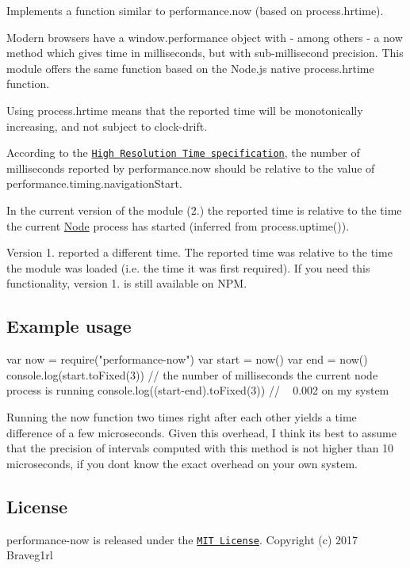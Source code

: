 Implements a function similar to {\ttfamily performance.\+now} (based on {\ttfamily process.\+hrtime}).

Modern browsers have a {\ttfamily window.\+performance} object with -\/ among others -\/ a {\ttfamily now} method which gives time in milliseconds, but with sub-\/millisecond precision. This module offers the same function based on the Node.\+js native {\ttfamily process.\+hrtime} function.

Using {\ttfamily process.\+hrtime} means that the reported time will be monotonically increasing, and not subject to clock-\/drift.

According to the \href{http://www.w3.org/TR/hr-time/}{\tt High Resolution Time specification}, the number of milliseconds reported by {\ttfamily performance.\+now} should be relative to the value of {\ttfamily performance.\+timing.\+navigation\+Start}.

In the current version of the module (2.) the reported time is relative to the time the current \mbox{\hyperlink{classNode}{Node}} process has started (inferred from {\ttfamily process.\+uptime()}).

Version 1. reported a different time. The reported time was relative to the time the module was loaded (i.\+e. the time it was first {\ttfamily require}d). If you need this functionality, version 1. is still available on N\+PM.

\subsection*{Example usage}


\begin{DoxyCode}
var now = require("performance-now")
var start = now()
var end = now()
console.log(start.toFixed(3)) // the number of milliseconds the current node process is running
console.log((start-end).toFixed(3)) // ~ 0.002 on my system
\end{DoxyCode}


Running the now function two times right after each other yields a time difference of a few microseconds. Given this overhead, I think it\textquotesingle{}s best to assume that the precision of intervals computed with this method is not higher than 10 microseconds, if you don\textquotesingle{}t know the exact overhead on your own system.

\subsection*{License}

performance-\/now is released under the \href{http://opensource.org/licenses/MIT}{\tt M\+IT License}. Copyright (c) 2017 Braveg1rl 